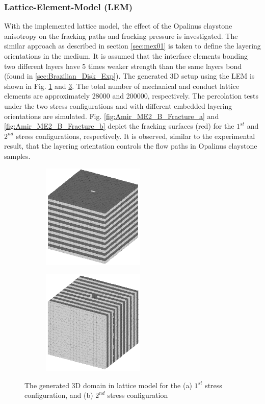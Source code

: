 \subsubsection*{Lattice-Element-Model (LEM)}

With the implemented lattice model, the effect of the Opalinus claystone anisotropy on the fracking paths and fracking pressure is investigated. The similar approach as described in section \ref {sec:mex01} is taken to define the layering orientations in the medium. It is assumed that the interface elements bonding two different layers have 5 times weaker strength than the same layers bond (found in \ref{sec:Brazilian_Disk_Exp}). The generated 3D setup using the LEM is shown in Fig. \ref{fig:Amir_Percolation_Setup_a} and \ref{fig:Amir_Percolation_Setup_b}. The total number of mechanical and conduct lattice elements are approximately 28000 and 200000, respectively.
The percolation tests under the two stress configurations and with different embedded layering orientations are simulated. Fig. \ref{fig:Amir_ME2_B_Fracture_a} and \ref{fig:Amir_ME2_B_Fracture_b} depict the fracking surfaces (red) for the $1^{st}$ and $2^{nd}$ stress configurations, respectively. It is observed, similar to the experimental result, that the layering orientation controls the flow paths in Opalinus claystone samples. 


\begin{figure}[!ht]
\begin{subfigure}[c]{0.48\textwidth}
\centering
\includegraphics[width=5cm,height=5cm]{figures/Amir_Percolation_Setup_a.png}
\subcaption{}
\label{fig:Amir_Percolation_Setup_a}
\end{subfigure}
\hfill
\begin{subfigure}[c]{0.48\textwidth}
\centering
\includegraphics[width=5cm,height=5cm]{figures/Amir_Percolation_Setup_b.png}
\subcaption{}
\label{fig:Amir_Percolation_Setup_b}
\end{subfigure}
\caption{The generated 3D domain in lattice model for the (a) $1^{st}$ stress configuration, and (b) $2^{nd}$ stress configuration}
\end{figure}

